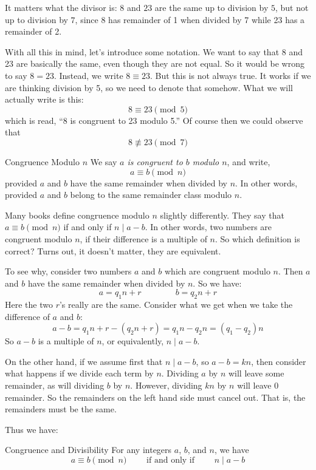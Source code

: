 \documentclass[12pt]{article}
\begin{document}
It matters what the divisor is: $8$ and $23$ are the same up to division by $5$, but not up to division by $7$, since $8$ has remainder of 1 when divided by 7 while 23 has a remainder of 2.  

With all this in mind, let's introduce some notation.  We want to say that $8$ and 23 are basically the same, even though they are not equal.  So it would be wrong to say $8 = 23$.  Instead, we write $8 \equiv 23$.  But this is not always true.  It works if we are thinking division by 5, so we need to denote that somehow.  What we will actually write is this:
\[8 \equiv 23 \pmod{5}\]
which is read, ``8 is congruent to 23 modulo 5.''  Of course then we could observe that
\[8 \not\equiv 23 \pmod{7}\]

\begin{defbox}{Congruence Modulo $n$}
	We say {\em $a$ is  congruent to $b$ modulo $n$}, and write,
	\[a \equiv b \pmod{n}\]
	provided $a$ and $b$ have the same remainder when divided by $n$.  In other words, provided $a$ and $b$ belong to the same remainder class modulo $n$.
\end{defbox}

Many books define congruence modulo $n$ slightly differently.  They say that $a \equiv b \pmod{n}$ if and only if $n \mid a-b$.  In other words, two numbers are congruent modulo $n$, if their difference is a multiple of $n$.  So which definition is correct?  Turns out, it doesn't matter, they are equivalent.

To see why, consider two numbers $a$ and $b$ which are congruent modulo $n$.  Then $a$ and $b$ have the same remainder when divided by $n$. So we have:
\[a = q_1 n + r \qquad\qquad b = q_2 n + r\]
Here the two $r$'s really are the same.  Consider what we get when we take the difference of $a$ and $b$:
\[a-b = q_1n + r - (q_2n + r) = q_1n - q_2 n = (q_1-q_2)n\]
So $a-b$ is a multiple of $n$, or equivalently, $n \mid a-b$.

On the other hand, if we assume first that $n \mid a-b$, so $a-b = kn$, then consider what happens if we divide each term by $n$.  Dividing $a$ by $n$ will leave some remainder, as will dividing $b$ by $n$.  However, dividing $kn$ by $n$ will leave 0 remainder.  So the remainders on the left hand side must cancel out.  That is, the remainders must be the same.

Thus we have:

\begin{defbox}{Congruence and Divisibility}
	For any integers $a$, $b$, and $n$, we have
	\[a \equiv b \pmod{n} \qquad \mbox{ if and only if } \qquad n \mid a-b\]
\end{defbox}
\end{document}
